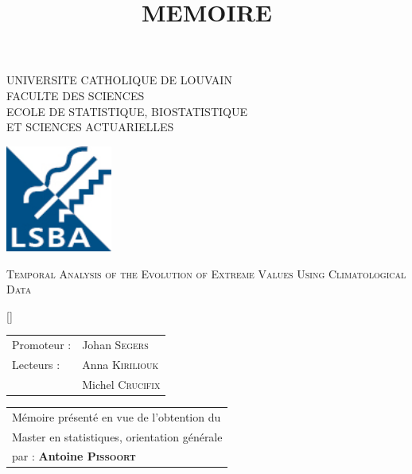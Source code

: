 \documentclass[11pt,a4paper,openany, twosided]{book}
\title{MEMOIRE}
\begin{document}
\thispagestyle{empty}


\begin{center}
	{\LARGE    UNIVERSITE CATHOLIQUE DE LOUVAIN} \\
	\vspace{0.2cm}
	{\large FACULTE DES SCIENCES} \\
	\vspace{0.2cm}
	{\Large ECOLE DE STATISTIQUE, BIOSTATISTIQUE \\
		\vspace{0.1cm}
		ET SCIENCES ACTUARIELLES }\\
\end{center}
\vfill

\begin{center}  \hspace*{-10mm} 
	\includegraphics[height = 3.5cm]{lsba.jpg}
\end{center}

\thispagestyle{empty}

\vfill


\begin{center}
	{\Large \textsc{Temporal Analysis of the Evolution of Extreme Values Using Climatological Data}}
	
\end{center}


\vfill

\begin{center}[]
	\begin{minipage}[c]{.45\linewidth}
		\begin{tabular}{ll}
			\vspace{0.2cm}
			Promoteur : & Johan \textsc{Segers} \\
			\vspace{0.2cm}
			Lecteurs : & Anna \textsc{Kiriliouk}\\
			\vspace{0.2cm}
			& Michel \textsc{Crucifix}
		\end{tabular}
	\end{minipage} \hfill
	\begin{minipage}[c]{.45\linewidth}
		\begin{tabularx}{\linewidth}{p{\textwidth}}
			Mémoire présenté en vue de \hbox{l'obtention} du \\   \vspace{0.1cm} Master en statistiques, orientation générale \\   \vspace{0.1cm} par :
			\textbf{Antoine \textsc{Pissoort}}
		\end{tabularx}
	\end{minipage}
\end{center}
\end{document}
